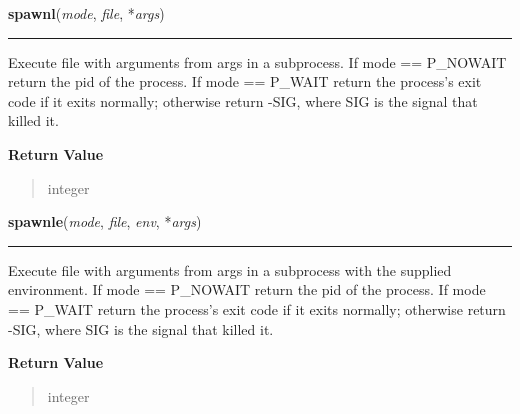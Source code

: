 \hspace{.8\funcindent}\begin{boxedminipage}{\funcwidth}

    \raggedright \textbf{spawnl}(\textit{mode}, \textit{file}, *\textit{args})

    \vspace{-1.5ex}

    \rule{\textwidth}{0.5\fboxrule}
\setlength{\parskip}{2ex}
    Execute file with arguments from args in a subprocess. If mode == 
    P\_NOWAIT return the pid of the process. If mode == P\_WAIT return the 
    process's exit code if it exits normally; otherwise return -SIG, where 
    SIG is the signal that killed it.

\setlength{\parskip}{1ex}
      \textbf{Return Value}
    \vspace{-1ex}

      \begin{quote}
      integer

      \end{quote}

    \end{boxedminipage}

    \label{os:spawnle}

    \vspace{0.5ex}

\hspace{.8\funcindent}\begin{boxedminipage}{\funcwidth}

    \raggedright \textbf{spawnle}(\textit{mode}, \textit{file}, \textit{env}, *\textit{args})

    \vspace{-1.5ex}

    \rule{\textwidth}{0.5\fboxrule}
\setlength{\parskip}{2ex}
    Execute file with arguments from args in a subprocess with the supplied
    environment. If mode == P\_NOWAIT return the pid of the process. If 
    mode == P\_WAIT return the process's exit code if it exits normally; 
    otherwise return -SIG, where SIG is the signal that killed it.

\setlength{\parskip}{1ex}
      \textbf{Return Value}
    \vspace{-1ex}

      \begin{quote}
      integer

      \end{quote}

    \end{boxedminipage}

